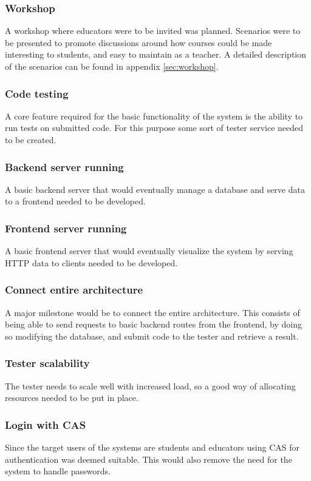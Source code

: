 \subsubsection{Workshop}
A workshop where educators were to be invited was planned. Scenarios were to be presented to promote discussions around how courses could be made interesting to students, and easy to maintain as a teacher. A detailed description of the scenarios can be found in appendix \ref{sec:workshop}.

\subsubsection{Code testing}
A core feature required for the basic functionality of the system is the ability to run tests on submitted code. For this purpose some sort of tester service needed to be created.

\subsubsection{Backend server running}
A basic backend server that would eventually manage a database and serve data to a frontend needed to be developed.

\subsubsection{Frontend server running}
A basic frontend server that would eventually visualize the system by serving HTTP data to clients needed to be developed.

\subsubsection{Connect entire architecture}
A major milestone would be to connect the entire architecture. This consists of being able to send requests to basic backend routes from the frontend, by doing so modifying the database, and submit code to the tester and retrieve a result.

\subsubsection{Tester scalability}
The tester needs to scale well with increased load, so a good way of allocating resources needed to be put in place.

\subsubsection{Login with CAS}
Since the target users of the systems are students and educators using CAS for authentication was deemed suitable. This would also remove the need for the system to handle passwords.

